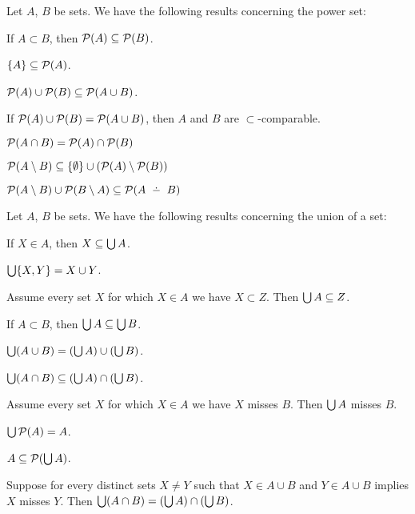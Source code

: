 \documentclass{article}
\begin{document}
\medbreak
Let $A$, $B$ be sets.
We have the following results concerning the power set:
\begin{thm}
\item\label{zfmisc1:67} If $A\subset B$, then $\mathcal{P}(A)\subseteq\mathcal{P}(B)$.
\item\label{zfmisc1:68} $\{A\}\subseteq\mathcal{P}(A)$.
\item\label{zfmisc1:69} $\mathcal{P}(A)\cup\mathcal{P}(B)\subseteq\mathcal{P}(A\cup B)$.
\item\label{zfmisc1:70} If $\mathcal{P}(A)\cup\mathcal{P}(B)=\mathcal{P}(A\cup B)$,
  then $A$ and $B$ are $\subset$-comparable.
\item\label{zfmisc1:71} $\mathcal{P}(A\cap B)=\mathcal{P}(A)\cap\mathcal{P}(B)$
\item\label{zfmisc1:72} $\mathcal{P}(A\setminus B)\subseteq\{\emptyset\}\cup(\mathcal{P}(A)\setminus\mathcal{P}(B))$ 
\item\label{zfmisc1:73} $\powerset(A\setminus B)\cup\powerset(B\setminus A)\subset\powerset(A\symdiff B)$
\end{thm}

\medbreak
Let $A$, $B$ be sets.
We have the following results concerning the union of a set:
\begin{thm}
\item\label{zfmisc1:74} If $X\in A$, then $X\subseteq\bigcup A$.
\item\label{zfmisc1:75} $\bigcup\{X,Y\}=X\cup Y$.
\item\label{zfmisc1:76} Assume every set $X$ for which $X\in A$ we have
  $X\subset Z$. Then $\bigcup A\subseteq Z$.
\item\label{zfmisc1:77} If $A\subset B$, then $\bigcup A\subseteq\bigcup B$.
\item\label{zfmisc1:78} $\bigcup(A\cup B)= (\bigcup A)\cup(\bigcup B)$.
\item\label{zfmisc1:79} $\bigcup(A\cap B)\subseteq(\bigcup A)\cap(\bigcup B)$.
\item\label{zfmisc1:80} Assume every set $X$ for which $X\in A$ we have
  $X$ misses $B$. Then $\bigcup A$ misses $B$.
\item\label{zfmisc1:81} $\bigcup\mathcal{P}(A)=A$.
\item\label{zfmisc1:82} $A\subseteq\mathcal{P}(\bigcup A)$.
\item\label{zfmisc1:83} Suppose for every distinct sets $X\neq Y$ such that
  $X\in A\cup B$ and $Y\in A\cup B$ implies $X$ misses $Y$.
  Then $\bigcup(A\cap B)=(\bigcup A)\cap(\bigcup B)$.
\end{thm}
\end{document}
